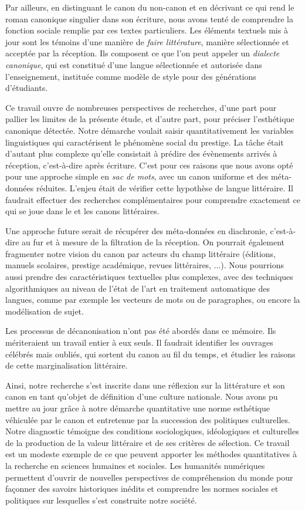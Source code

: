 Par ailleurs, en distinguant le canon du non-canon et en décrivant ce qui rend le roman canonique singulier dans son écriture, nous avons tenté de comprendre la fonction sociale remplie par ces textes particuliers. Les éléments textuels mis à jour sont les témoins d'une manière de \textit{faire littérature}, manière sélectionnée et acceptée par la réception. Ils composent ce que l'on peut appeler un \textit{dialecte canonique}, qui est constitué d'une langue sélectionnée et autorisée dans l'enseignement, instituée comme modèle de style pour des générations d'étudiants.

Ce travail ouvre de nombreuses perspectives de recherches, d'une part pour pallier les limites de la présente étude, et d'autre part, pour préciser l'esthétique canonique détectée. Notre démarche voulait saisir quantitativement les variables linguistiques qui caractérisent le phénomène social du prestige. La tâche était d'autant plus complexe qu'elle consistait à prédire des évènements arrivés à réception, c'est-à-dire après écriture. C'est pour ces raisons que nous avons opté pour une approche simple en \textit{sac de mots}, avec un canon uniforme et des méta-données réduites. L'enjeu était de vérifier cette hypothèse de langue littéraire. Il faudrait effectuer des recherches complémentaires pour comprendre exactement ce qui se joue dans le et les canons littéraires.

Une approche future serait de récupérer des méta-données en diachronie, c'est-à-dire au fur et à mesure de la filtration de la réception. On pourrait également fragmenter notre vision du canon par acteurs du champ littéraire (éditions, manuels scolaires, prestige académique, revues littéraires, ...). Nous pourrions aussi prendre des caractéristiques textuelles plus complexes, avec des techniques algorithmiques au niveau de l'état de l'art en traitement automatique des langues, comme par exemple les vecteurs de mots ou de paragraphes, ou encore la modélisation de sujet. 

Les processus de décanonisation n'ont pas été abordés dans ce mémoire. Ils mériteraient un travail entier à eux seuls. Il faudrait identifier les ouvrages célébrés mais oubliés, qui sortent du canon au fil du temps, et étudier les raisons de cette marginalisation littéraire. 

Ainsi, notre recherche s'est inscrite dans une réflexion sur la littérature et son canon en tant qu'objet de définition d'une culture nationale. Nous avons pu mettre au jour grâce à notre démarche quantitative une norme esthétique véhiculée par le canon et entretenue par la succession des politiques culturelles. Notre diagnostic témoigne des conditions sociologiques, idéologiques et culturelles de la production de la valeur littéraire et de ses critères de sélection. Ce travail est un modeste exemple de ce que peuvent apporter les méthodes quantitatives à la recherche en sciences humaines et sociales. Les humanités numériques permettent d'ouvrir de nouvelles perspectives de compréhension du monde pour façonner des savoirs historiques inédits et comprendre les normes sociales et politiques sur lesquelles s'est construite notre société.






